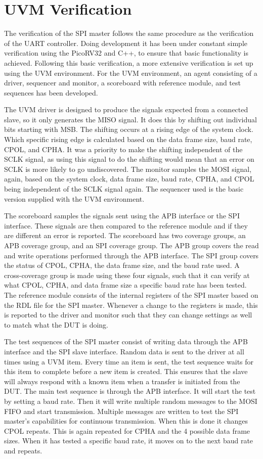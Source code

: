 \documentclass[./dissertation.tex]{subfiles}
\begin{document}
\section{UVM Verification}
The verification of the SPI master follows the same procedure as the verification of the UART controller. Doing development it has been under constant simple verification using the PicoRV32 and C++, to ensure that basic functionality is achieved. Following this basic verification, a more extensive verification is set up using the UVM environment. For the UVM environment, an agent consisting of a driver, sequencer and monitor, a scoreboard with reference module, and test sequences has been developed. 

The UVM driver is designed to produce the signals expected from a connected slave, so it only generates the MISO signal. It does this by shifting out individual bits starting with MSB. The shifting occurs at a rising edge of the system clock. Which specific rising edge is calculated based on the data frame size, baud rate, CPOL, and CPHA. It was a priority to make the shifting independent of the SCLK signal, as using this signal to do the shifting would mean that an error on SCLK is more likely to go undiscovered. The monitor samples the MOSI signal, again, based on the system clock, data frame size, baud rate, CPHA, and CPOL being independent of the SCLK signal again. The sequencer used is the basic version supplied with the UVM environment.

The scoreboard samples the signals sent using the APB interface or the SPI interface. These signals are then compared to the reference module and if they are different an error is reported. The scoreboard has two coverage groups, an APB coverage group, and an SPI coverage group. The APB group covers the read and write operations performed through the APB interface. The SPI group covers the status of CPOL, CPHA, the data frame size, and the baud rate used. A cross-coverage group is made using these four signals, such that it can verify at what CPOL, CPHA, and data frame size a specific baud rate has been tested. The reference module consists of the internal registers of the SPI master based on the RDL file for the SPI master. Whenever a change to the registers is made, this is reported to the driver and monitor such that they can change settings as well to match what the DUT is doing. 

The test sequences of the SPI master consist of writing data through the APB interface and the SPI slave interface. Random data is sent to the driver at all times using a UVM item. Every time an item is sent, the test sequence waits for this item to complete before a new item is created. This ensures that the slave will always respond with a known item when a transfer is initiated from the DUT. The main test sequence is through the APB interface. It will start the test by setting a baud rate. Then it will write multiple random messages to the MOSI FIFO and start transmission. Multiple messages are written to test the SPI master's capabilities for continuous transmission. When this is done it changes CPOL repeats. This is again repeated for CPHA and the 4 possible data frame sizes. When it has tested a specific baud rate, it moves on to the next baud rate and repeats. 
\end{document}
